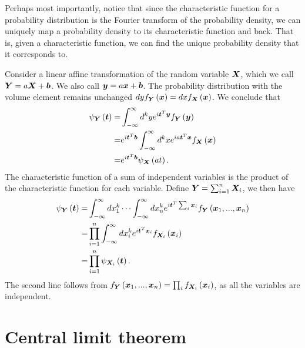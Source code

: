 Perhaps most importantly, notice that since the characteristic function
for a probability distribution is the Fourier transform of the probability density,
we can uniquely map a probability density to its characteristic function and back.
That is, given a characteristic function, we can find the unique probability
density that it corresponds to.

Consider a linear affine transformation of the random variable ${\bm X}$,
which we call ${\bm Y} = a{\bm X} + {\bm b}$. We also call ${\bm y} = a{\bm x} + {\bm b}$.
The probability distribution with the volume element remains unchanged 
$dy f_{{\bm Y}}\left({\bm x}\right)
    =
    dx f_{{\bm X}}\left({\bm x}\right)
    $.
We conclude that
\begin{align}
    \psi_{{\bm Y}}\left({\bm t}\right)
    =&
    \int_{-\infty}^{\infty} d^ky e^{i{\bm t}^T{\bm y}} f_{{\bm Y}}\left({\bm y}\right)
    \nonumber\\
    =&
    e^{i{\bm t}^T{\bm b}}\int_{-\infty}^{\infty} d^kx e^{ia{\bm t}^T{\bm x}} f_{{\bm X}}\left({\bm x}\right)
    \nonumber\\
    =&
    e^{i{\bm t}^T{\bm b}}\psi_{{\bm X}}\left(at\right)
    .
\end{align}
The characteristic function of a sum of independent variables 
is the product of the characteristic function for each variable.
Define ${\bm Y} = \sum_{i=1}^n {\bm X}_i$, we then have
\begin{align}
    \psi_{{\bm Y}}\left({\bm t}\right)
    =&
    \int_{-\infty}^{\infty} dx^k_1\cdots \int_{-\infty}^{\infty} dx^k_n 
        e^{i{\bm t}^T\sum_i{\bm x}_i} f_{{\bm Y}}\left({\bm x}_1,...,{\bm x}_n\right)  
    \nonumber\\
    =&
    \prod_{i=1}^n \int_{-\infty}^{\infty} dx^k_i e^{i{\bm t}^T{\bm x}_i} f_{{\bm X}_i}\left({\bm x}_i\right)
    \nonumber\\
    =&
    \prod_{i=1}^n \psi_{{\bm X}_i}\left({\bm t}\right) 
    .
\end{align}
The second line follows from 
$f_{{\bm Y}}\left({\bm x}_1,...,{\bm x}_n\right)=\prod_i f_{{\bm X}_i}\left({\bm x}_i\right)$,
as all the variables are independent.


\section{Central limit theorem}

